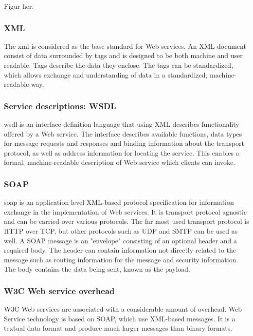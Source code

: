 Figur her.


\subsubsection{XML}

The \gls{xml} is considered as the base standard for Web services. An XML
document consist of data surrounded by tags and is designed to be both machine
and user readable. Tags describe the data they enclose. The tags can be
standardized, which allows exchange and understanding of data in a standardized,
machine-readable way.


\subsubsection{Service descriptions: WSDL}

\gls{wsdl} is an interface definition language that using XML describes
functionality offered by a Web service. The interface describes available
functions, data types for message requests and responses and binding
information about the transport protocol, as well as address information for
locating the service. This enables a formal, machine-readable description of
Web service which clients can invoke.


\subsubsection{SOAP}

\gls{soap} is an application level XML-based protocol specification for
information exchange in the implementation of Web services. It is transport
protocol agnostic and can be carried over various protocols. The far most used
transport protocol is HTTP over TCP, but other protocols such as UDP and SMTP
can be used as well. A SOAP message is an "envelope" consisting of an optional
header and a required body. The header can contain information not directly
related to the message such as routing information for the message and
security information. The body contains the data being sent, known as the
payload.

\subsubsection{W3C Web service overhead}

W3C Web services are associated with a considerable amount of overhead. Web
Service technology is based on SOAP, which use XML-based messages. It is a
textual data format and produce much larger messages than binary formats.

